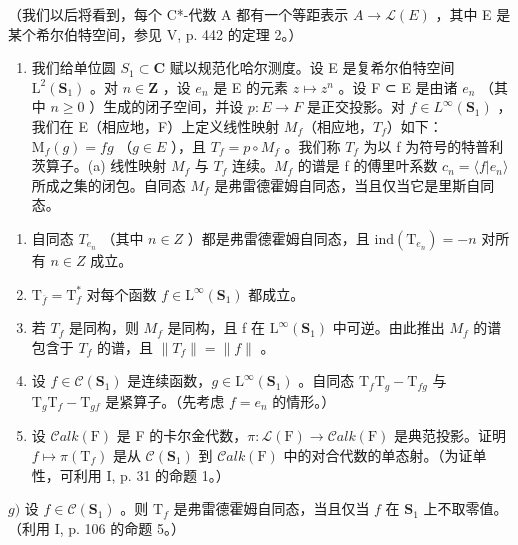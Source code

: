 （我们以后将看到，每个 C*-代数 A 都有一个等距表示 \(A \to \mathcal{L}(E)\) ，其中 E 是某个希尔伯特空间，参见 V, p. 442 的定理 2。）

\begin{enumerate}
\def\labelenumi{\arabic{enumi})}
\setcounter{enumi}{6}
\tightlist
\item
  我们给单位圆 \(S_{1} \subset \mathbf{C}\) 赋以规范化哈尔测度。设 E 是复希尔伯特空间 \(\mathrm{L}^{2}(\mathbf{S}_{1})\) 。对 \(n \in \mathbf{Z}\) ，设 \(e_{n}\) 是 E 的元素 \(z \mapsto z^{n}\) 。设 F ⊂ E 是由诸 \(e_{n}\) （其中 \(n \geqslant 0\) ）生成的闭子空间，并设 \(p: E \to F\) 是正交投影。对 \(f \in L^{\infty}(\mathbf{S}_{1})\) ，我们在 E（相应地，F）上定义线性映射 \(M_{f}\)（相应地，\(T_{f}\)）如下：\(\mathrm{M}_{f}(g) = fg\) （\(g \in E\) ），且 \(T_{f} = p \circ M_{f}\) 。我们称 \(T_{f}\) 为以 f 为符号的特普利茨算子。(a) 线性映射 \(M_{f}\) 与 \(T_{f}\) 连续。\(M_{f}\) 的谱是 f 的傅里叶系数 \(c_{n} = \langle f | e_{n} \rangle\) 所成之集的闭包。自同态 \(M_{f}\) 是弗雷德霍姆自同态，当且仅当它是里斯自同态。
\end{enumerate}

\begin{enumerate}
\def\labelenumi{\alph{enumi})}
\setcounter{enumi}{1}
\item
  自同态 \(T_{e_{n}}\) （其中 \(n \in Z\) ）都是弗雷德霍姆自同态，且 \(\text{ind}(\mathrm{T}_{e_{n}}) = -n\) 对所有 \(n \in Z\) 成立。
\item
  \(\mathrm{T}_{\overline{f}} = \mathrm{T}_f^*\) 对每个函数 \(f\in \mathrm{L}^{\infty}(\mathbf{S}_1)\) 都成立。
\item
  若 \(T_{f}\) 是同构，则 \(M_{f}\) 是同构，且 f 在 \(\mathrm{L}^{\infty}(\mathbf{S}_{1})\) 中可逆。由此推出 \(M_{f}\) 的谱包含于 \(T_{f}\) 的谱，且 \(\|T_{f}\|=\|f\|\) 。
\item
  设 \(f \in \mathcal{C}(\mathbf{S}_1)\) 是连续函数，\(g \in \mathrm{L}^{\infty}(\mathbf{S}_1)\) 。自同态 \(\mathrm{T}_f\mathrm{T}_g - \mathrm{T}_{fg}\) 与 \(\mathrm{T}_g\mathrm{T}_f - \mathrm{T}_{gf}\) 是紧算子。（先考虑 \(f = e_n\) 的情形。）
\item
  设 \(\mathcal{C}alk(\mathrm{F})\) 是 F 的卡尔金代数，\(\pi\colon\mathcal{L}(\mathrm{F})\to\mathcal{C}alk(\mathrm{F})\) 是典范投影。证明 \(f\mapsto\pi(\mathrm{T}_{f})\) 是从 \(\mathcal{C}(\mathbf{S}_{1})\) 到 \(\mathcal{C}alk(\mathrm{F})\) 中的对合代数的单态射。（为证单性，可利用 I, p. 31 的命题 1。）
\end{enumerate}

\(g)\) 设 \(f \in \mathcal{C}(\mathbf{S}_1)\) 。则 \(\mathrm{T}_f\) 是弗雷德霍姆自同态，当且仅当 \(f\) 在 \(\mathbf{S}_1\) 上不取零值。（利用 I, p. 106 的命题 5。）


